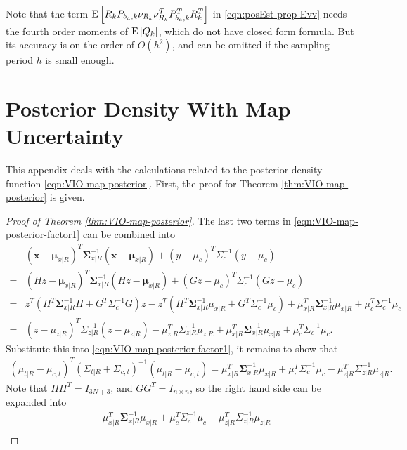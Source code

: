 Note that the term $\mathrm{E}\left[ R_kP_{b_a,k}\nu_{R_k}\nu_{R_k}^TP_{b_a,k}^TR_k^T \right]$ in \eqref{eqn:posEst-prop-Evv} needs the fourth order moments of $\mathrm{E}\left[ Q_k \right]$, which do not have closed form formula.
But its accuracy is on the order of $O(h^2)$, and can be omitted if the sampling period $h$ is small enough.

\chapter{Posterior Density With Map Uncertainty} \label{app:VIO-map-posterior}

This appendix deals with the calculations related to the posterior density function \eqref{eqn:VIO-map-posterior}.
First, the proof for Theorem \ref{thm:VIO-map-posterior} is given.

\begin{proof}[Proof of Theorem \ref{thm:VIO-map-posterior}]
	The last two terms in \eqref{eqn:VIO-map-posterior-factor1} can be combined into
	\begin{align*}
		&(\bm{x}-\bm{\mu}_{x|R})^T \bm{\Sigma}_{x|R}^{-1} (\bm{x}-\bm{\mu}_{x|R}) + (y-\mu_c)^T \Sigma_c^{-1} (y-\mu_c) \\
		= &(Hz-\bm{\mu}_{x|R})^T \bm{\Sigma}_{x|R}^{-1} (Hz-\bm{\mu}_{x|R}) + (Gz-\mu_c)^T \Sigma_c^{-1} (Gz-\mu_c) \\
		= &z^T \left( H^T\bm{\Sigma}_{x|R}^{-1}H + G^T\Sigma_c^{-1}G \right) z - z^T \left( H^T\bm{\Sigma}_{x|R}^{-1}\mu_{x|R} + G^T\Sigma_c^{-1}\mu_c \right) + \mu_{x|R}^T \bm{\Sigma}_{x|R}^{-1} \mu_{x|R} + \mu_c^T \Sigma_c^{-1} \mu_c \\
		= & (z-\mu_{z|R})^T \Sigma_{z|R}^{-1} (z-\mu_{z|R}) - \mu_{z|R}^T \Sigma_{z|R}^{-1} \mu_{z|R} + \mu_{x|R}^T \bm{\Sigma}_{x|R}^{-1} \mu_{x|R} + \mu_c^T \Sigma_c^{-1} \mu_c.
	\end{align*}
	Substitute this into \eqref{eqn:VIO-map-posterior-factor1}, it remains to show that
	\begin{align*}
		(\mu_{t|R}-\mu_{c,t})^T (\Sigma_{t|R} + \Sigma_{c,t})^{-1} (\mu_{t|R}-\mu_{c,t}) = \mu_{x|R}^T \bm{\Sigma}_{x|R}^{-1} \mu_{x|R} + \mu_c^T \Sigma_c^{-1} \mu_c - \mu_{z|R}^T \Sigma_{z|R}^{-1} \mu_{z|R}.
	\end{align*}
	Note that $HH^T = I_{3N+3}$, and $GG^T = I_{n\times n}$, so the right hand side can be expanded into
	\begin{align} \label{eqn:VIO-three-terms}
		&\mu_{x|R}^T \bm{\Sigma}_{x|R}^{-1} \mu_{x|R} + \mu_c^T \Sigma_c^{-1} \mu_c - \mu_{z|R}^T \Sigma_{z|R}^{-1} \mu_{z|R} \nonumber \\

\end{align}
\end{proof}

